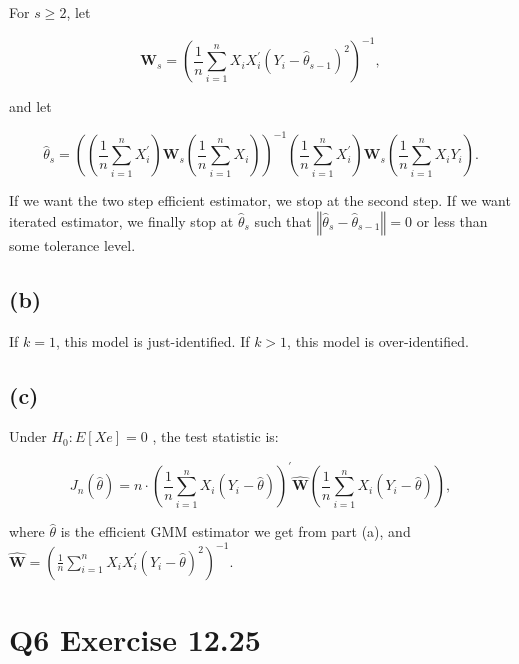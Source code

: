 \documentclass{article}
\begin{document}
For $s\geq 2$, let

\begin{equation*}
\mathbf{W}_{s}\mathbf{=}\left( \frac{1}{n}\sum_{i=1}^{n}X_{i}X_{i}^{\prime
}\left( Y_{i}-\hat{\theta}_{s-1}\right) ^{2}\right) ^{-1},
\end{equation*}

and let

\begin{equation*}
\hat{\theta}_{s}=\left( \left( \frac{1}{n}\sum_{i=1}^{n}X_{i}^{\prime
}\right) \mathbf{W}_{s}\left( \frac{1}{n}\sum_{i=1}^{n}X_{i}\right) \right)
^{-1}\left( \frac{1}{n}\sum_{i=1}^{n}X_{i}^{\prime }\right) \mathbf{W}%
_{s}\left( \frac{1}{n}\sum_{i=1}^{n}X_{i}Y_{i}\right) .
\end{equation*}

If we want the two step efficient estimator, we stop at the second step. If
we want iterated estimator, we finally stop at $\hat{\theta}_{s}$ such that $%
\left\Vert \hat{\theta}_{s}-\hat{\theta}_{s-1}\right\Vert =0$ or less than
some tolerance level.

\subsection*{(b)}

If $k=1$, this model is just-identified. If $k>1$, this model is
over-identified.

\subsection*{(c)}

Under $H_{0}:E\left[ Xe\right] =0$ , the test statistic is:

\begin{equation*}
J_{n}\left( \hat{\theta}\right) =n\cdot \left( \frac{1}{n}%
\sum_{i=1}^{n}X_{i}\left( Y_{i}-\hat{\theta}\right) \right) ^{\prime }%
\mathbf{\hat{W}}\left( \frac{1}{n}\sum_{i=1}^{n}X_{i}\left( Y_{i}-\hat{\theta%
}\right) \right) ,
\end{equation*}

where $\hat{\theta}$ is the efficient GMM estimator we get from part (a),
and $\mathbf{\hat{W}=}\left( \frac{1}{n}\sum_{i=1}^{n}X_{i}X_{i}^{\prime
}\left( Y_{i}-\hat{\theta}\right) ^{2}\right) ^{-1}$.

\section*{Q6 Exercise 12.25}
\end{document}
